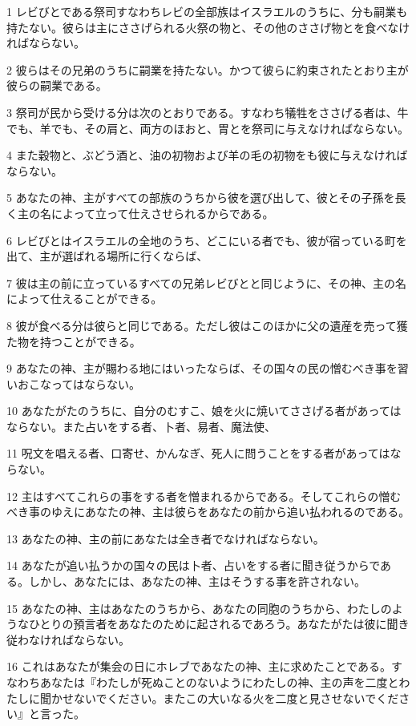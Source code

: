 \par 1 レビびとである祭司すなわちレビの全部族はイスラエルのうちに、分も嗣業も持たない。彼らは主にささげられる火祭の物と、その他のささげ物とを食べなければならない。
\par 2 彼らはその兄弟のうちに嗣業を持たない。かつて彼らに約束されたとおり主が彼らの嗣業である。
\par 3 祭司が民から受ける分は次のとおりである。すなわち犠牲をささげる者は、牛でも、羊でも、その肩と、両方のほおと、胃とを祭司に与えなければならない。
\par 4 また穀物と、ぶどう酒と、油の初物および羊の毛の初物をも彼に与えなければならない。
\par 5 あなたの神、主がすべての部族のうちから彼を選び出して、彼とその子孫を長く主の名によって立って仕えさせられるからである。
\par 6 レビびとはイスラエルの全地のうち、どこにいる者でも、彼が宿っている町を出て、主が選ばれる場所に行くならば、
\par 7 彼は主の前に立っているすべての兄弟レビびとと同じように、その神、主の名によって仕えることができる。
\par 8 彼が食べる分は彼らと同じである。ただし彼はこのほかに父の遺産を売って獲た物を持つことができる。
\par 9 あなたの神、主が賜わる地にはいったならば、その国々の民の憎むべき事を習いおこなってはならない。
\par 10 あなたがたのうちに、自分のむすこ、娘を火に焼いてささげる者があってはならない。また占いをする者、卜者、易者、魔法使、
\par 11 呪文を唱える者、口寄せ、かんなぎ、死人に問うことをする者があってはならない。
\par 12 主はすべてこれらの事をする者を憎まれるからである。そしてこれらの憎むべき事のゆえにあなたの神、主は彼らをあなたの前から追い払われるのである。
\par 13 あなたの神、主の前にあなたは全き者でなければならない。
\par 14 あなたが追い払うかの国々の民は卜者、占いをする者に聞き従うからである。しかし、あなたには、あなたの神、主はそうする事を許されない。
\par 15 あなたの神、主はあなたのうちから、あなたの同胞のうちから、わたしのようなひとりの預言者をあなたのために起されるであろう。あなたがたは彼に聞き従わなければならない。
\par 16 これはあなたが集会の日にホレブであなたの神、主に求めたことである。すなわちあなたは『わたしが死ぬことのないようにわたしの神、主の声を二度とわたしに聞かせないでください。またこの大いなる火を二度と見させないでください』と言った。
